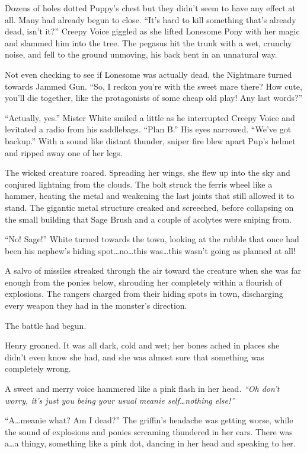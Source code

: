 Dozens of holes dotted Puppy's chest but they didn't seem to have any effect at all. Many had already begun to close. ``It's hard to kill something that's already dead, isn't it?'' Creepy Voice giggled as she lifted Lonesome Pony with her magic and slammed him into the tree. The pegasus hit the trunk with a wet, crunchy noise, and fell to the ground unmoving, his back bent in an unnatural way.

Not even checking to see if Lonesome was actually dead, the Nightmare turned towards Jammed Gun. ``So, I reckon you're with the sweet mare there? How cute, you'll die together, like the protagonists of some cheap old play! Any last words?''

``Actually, yes.'' Mister White smiled a little as he interrupted Creepy Voice and levitated a radio from his saddlebags. ``Plan B.'' His eyes narrowed. ``We've got backup.'' With a sound like distant thunder, sniper fire blew apart Pup's helmet and ripped away one of her legs.

The wicked creature roared. Spreading her wings, she flew up into the sky and conjured lightning from the clouds. The bolt struck the ferris wheel like a hammer, heating the metal and weakening the last joints that still allowed it to stand. The gigantic metal structure creaked and screeched, before collapsing on the small building that Sage Brush and a couple of acolytes were sniping from.

``No! Sage!'' White turned towards the town, looking at the rubble that once had been his nephew's hiding spot\dots no\dots this was\dots this wasn't going as planned at all!

A salvo of missiles streaked through the air toward the creature when she was far enough from the ponies below, shrouding her completely within a flourish of explosions. The rangers charged from their hiding spots in town, discharging every weapon they had in the monster's direction.

The battle had begun.

\horizonline

Henry groaned. It was all dark, cold and wet; her bones ached in places she didn't even know she had, and she was almost sure that something was completely wrong.

A sweet and merry voice hammered like a pink flash in her head. \emph{``Oh don't worry, it's just you being your usual meanie self\dots nothing else!''}

``A\dots meanie what? Am I dead?'' The griffin's headache was getting worse, while the sound of explosions and ponies screaming thundered in her ears. There was a\dots a thingy, something like a pink dot, dancing in her head and speaking to her.

